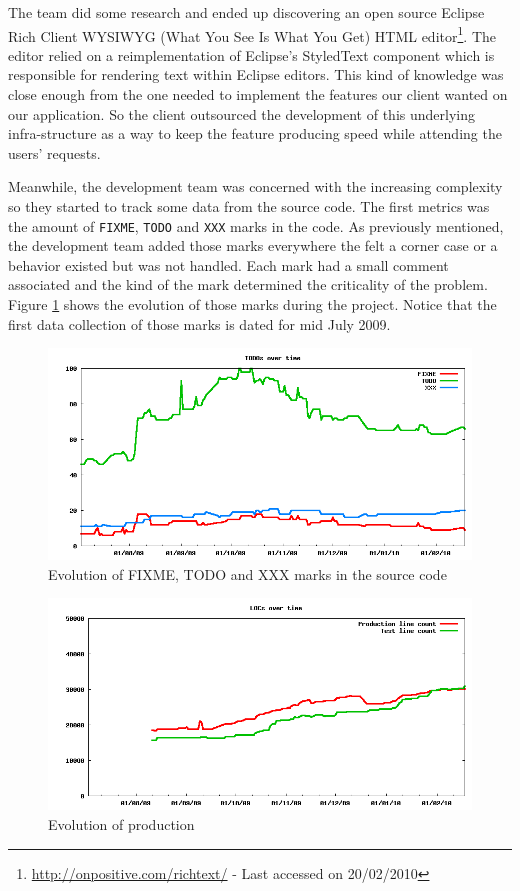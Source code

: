 \documentclass[lnbip]{svmultln}
\begin{document}
The team did some research and ended up discovering an open source
Eclipse Rich Client WYSIWYG (What You See Is What You Get) HTML
editor\footnote{\url{http://onpositive.com/richtext/} - Last accessed on
20/02/2010}. The editor relied on a reimplementation of Eclipse's
StyledText component which is responsible for rendering text within
Eclipse editors. This kind of knowledge was close enough from the one
needed to implement the features our client wanted on our
application. So the client outsourced the development of this
underlying infra-structure as a way to keep the feature producing
speed while attending the users' requests.

Meanwhile, the development team was concerned with the increasing
complexity so they started to track some data from the source
code. The first metrics was the amount of \texttt{FIXME},
\texttt{TODO} and \texttt{XXX} marks in the code. As previously
mentioned, the development team added those marks everywhere the felt
a corner case or a behavior existed but was not handled. Each mark had
a small comment associated and the kind of the mark determined the
criticality of the problem. Figure \ref{fig:TODOs} shows the evolution
of those marks during the project. Notice that the first data
collection of those marks is dated for mid July 2009.

\begin{figure}[hbt]
  \centerline{
    \includegraphics[width=120mm]{TODOs.png}
  }
  \caption{Evolution of FIXME, TODO and XXX marks in the source code}
  \label{fig:TODOs}
\end{figure}

\begin{figure}[hbt]
  \centerline{
    \includegraphics[width=120mm]{LOCs.png}
  }
  \caption{Evolution of production }
  \label{fig:LOCs}
\end{figure}
\end{document}
